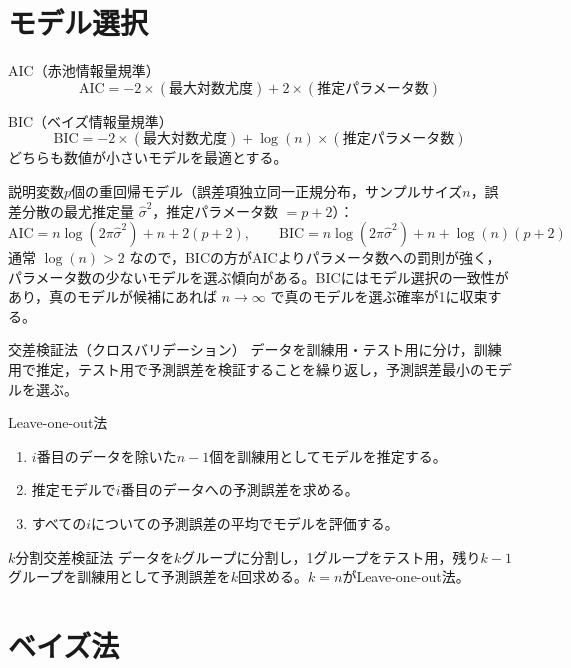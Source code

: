 \documentclass[a4paper,11pt]{ltjsarticle}
\begin{document}
\section{モデル選択}

\begin{term}{AIC（赤池情報量規準）}
\[
\mathrm{AIC} = -2\times(\text{最大対数尤度}) + 2\times(\text{推定パラメータ数})
\]
\end{term}

\begin{term}{BIC（ベイズ情報量規準）}
\[
\mathrm{BIC} = -2\times(\text{最大対数尤度}) + \log(n)\times(\text{推定パラメータ数})
\]
どちらも数値が小さいモデルを最適とする。
\end{term}

説明変数$p$個の重回帰モデル（誤差項独立同一正規分布，サンプルサイズ$n$，誤差分散の最尤推定量 $\hat\sigma^2$，推定パラメータ数 $=p+2$）：
\[
\mathrm{AIC} = n\log(2\pi\hat\sigma^2)+n+2(p+2),
\qquad
\mathrm{BIC} = n\log(2\pi\hat\sigma^2)+n+\log(n)(p+2)
\]
通常 $\log(n)>2$ なので，BICの方がAICよりパラメータ数への罰則が強く，パラメータ数の少ないモデルを選ぶ傾向がある。BICにはモデル選択の一致性があり，真のモデルが候補にあれば $n\to\infty$ で真のモデルを選ぶ確率が1に収束する。

\begin{term}{交差検証法（クロスバリデーション）}
データを訓練用・テスト用に分け，訓練用で推定，テスト用で予測誤差を検証することを繰り返し，予測誤差最小のモデルを選ぶ。
\end{term}

\begin{term}{Leave-one-out法}
\begin{enumerate}[label=\arabic*.]
\item $i$番目のデータを除いた$n-1$個を訓練用としてモデルを推定する。
\item 推定モデルで$i$番目のデータへの予測誤差を求める。
\item すべての$i$についての予測誤差の平均でモデルを評価する。
\end{enumerate}
\end{term}

\begin{term}{$k$分割交差検証法}
データを$k$グループに分割し，1グループをテスト用，残り$k-1$グループを訓練用として予測誤差を$k$回求める。$k=n$がLeave-one-out法。
\end{term}

\section{ベイズ法}
\end{document}
